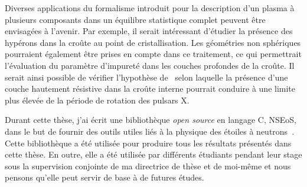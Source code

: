 Diverses applications du formalisme introduit pour la description d'un plasma à
plusieurs composants dans un équilibre statistique complet peuvent être 
envisagées à l'avenir. 
Par exemple, il serait intéressant d'étudier la présence des hypérons dans la 
croûte au point de cristallisation. 
Les géométries non sphériques pourraient également être prises en compte dans 
ce traitement, ce qui permettrait l'évaluation du paramètre d'impureté dans les 
couches profondes de la croûte. Il serait ainsi possible de vérifier 
l'hypothèse de~\cite{Pons2013} selon laquelle la présence d'une couche 
hautement résistive dans la croûte interne pourrait conduire à une limite plus 
élevée de la période de rotation des pulsars X.

Durant cette thèse, j'ai écrit une bibliothèque \textit{open source} en 
langage C, NSEoS, dans le but de fournir des outils utiles liés à la physique 
des étoiles à neutrons~\cite{NSEoS}. Cette bibliothèque a été utilisée pour 
produire tous les résultats présentés dans cette thèse. 
En outre, elle a été utilisée par différents étudiants pendant leur stage 
sous la supervision conjointe de ma directrice de thèse et de moi-même et 
nous pensons qu'elle peut servir de base à de futures études.

\clearpage\thispagestyle{empty}
